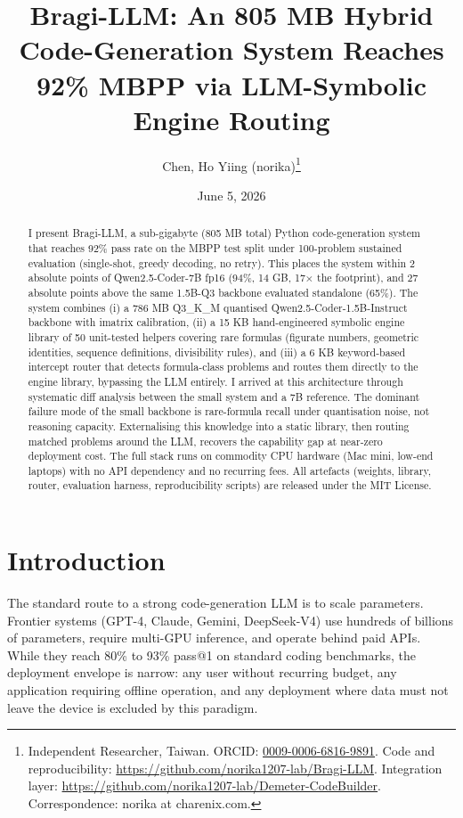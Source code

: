 \documentclass[11pt,a4paper]{article}
\title{Bragi-LLM: An 805 MB Hybrid Code-Generation System Reaches 92\% MBPP via LLM-Symbolic Engine Routing}
\author{%
  Chen, Ho Yiing (norika)\thanks{Independent Researcher, Taiwan.
  ORCID: \href{https://orcid.org/0009-0006-6816-9891}{0009-0006-6816-9891}.
  Code and reproducibility: \url{https://github.com/norika1207-lab/Bragi-LLM}.
  Integration layer: \url{https://github.com/norika1207-lab/Demeter-CodeBuilder}.
  Correspondence: norika at charenix.com.}%
}
\date{June 5, 2026}
\begin{document}
\maketitle

\begin{abstract}
I present Bragi-LLM, a sub-gigabyte (805 MB total) Python code-generation system that reaches 92\% pass rate on the MBPP test split under 100-problem sustained evaluation (single-shot, greedy decoding, no retry). This places the system within 2 absolute points of Qwen2.5-Coder-7B fp16 (94\%, 14 GB, 17$\times$ the footprint), and 27 absolute points above the same 1.5B-Q3 backbone evaluated standalone (65\%). The system combines (i) a 786 MB Q3\_K\_M quantised Qwen2.5-Coder-1.5B-Instruct backbone with imatrix calibration, (ii) a 15 KB hand-engineered symbolic engine library of 50 unit-tested helpers covering rare formulas (figurate numbers, geometric identities, sequence definitions, divisibility rules), and (iii) a 6 KB keyword-based intercept router that detects formula-class problems and routes them directly to the engine library, bypassing the LLM entirely. I arrived at this architecture through systematic diff analysis between the small system and a 7B reference. The dominant failure mode of the small backbone is rare-formula recall under quantisation noise, not reasoning capacity. Externalising this knowledge into a static library, then routing matched problems around the LLM, recovers the capability gap at near-zero deployment cost. The full stack runs on commodity CPU hardware (Mac mini, low-end laptops) with no API dependency and no recurring fees. All artefacts (weights, library, router, evaluation harness, reproducibility scripts) are released under the MIT License.
\end{abstract}

\section{Introduction}

The standard route to a strong code-generation LLM is to scale parameters. Frontier systems (GPT-4, Claude, Gemini, DeepSeek-V4) use hundreds of billions of parameters, require multi-GPU inference, and operate behind paid APIs. While they reach 80\% to 93\% pass@1 on standard coding benchmarks, the deployment envelope is narrow: any user without recurring budget, any application requiring offline operation, and any deployment where data must not leave the device is excluded by this paradigm.
\end{document}
